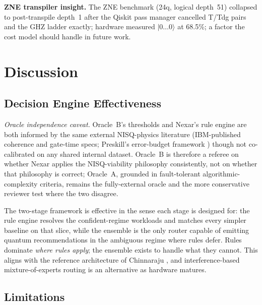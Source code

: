 \documentclass[10pt,conference]{IEEEtran}
\begin{document}
\textbf{ZNE transpiler insight.} The ZNE benchmark (24q, logical depth~51) collapsed to post-transpile depth~1 after the Qiskit pass manager cancelled T/Tdg pairs and the GHZ ladder exactly; hardware measured $|0\ldots0\rangle$ at 68.5\%; a factor the cost model should handle in future work.

\section{Discussion}

\subsection{Decision Engine Effectiveness}\label{sec:discussion-effectiveness}

\emph{Oracle independence caveat.} Oracle~B's thresholds and Nexar's rule engine are both informed by the same external NISQ-physics literature (IBM-published coherence and gate-time specs; Preskill's error-budget framework \cite{preskill2018}) though not co-calibrated on any shared internal dataset. Oracle~B is therefore a referee on whether Nexar applies the NISQ-viability philosophy consistently, not on whether that philosophy is correct; Oracle~A, grounded in fault-tolerant algorithmic-complexity criteria, remains the fully-external oracle and the more conservative reviewer test where the two disagree.

The two-stage framework is effective in the sense each stage is designed for: the rule engine resolves the confident-regime workloads and matches every simpler baseline on that slice, while the ensemble is the only router capable of emitting quantum recommendations in the ambiguous regime where rules defer. Rules dominate \emph{where rules apply}; the ensemble exists to handle what they cannot. This aligns with the reference architecture of Chinnaraju \cite{chinnaraju2025}, and interference-based mixture-of-experts routing \cite{heddad2025} is an alternative as hardware matures.

\subsection{Limitations}\label{sec:limitations}
\end{document}
